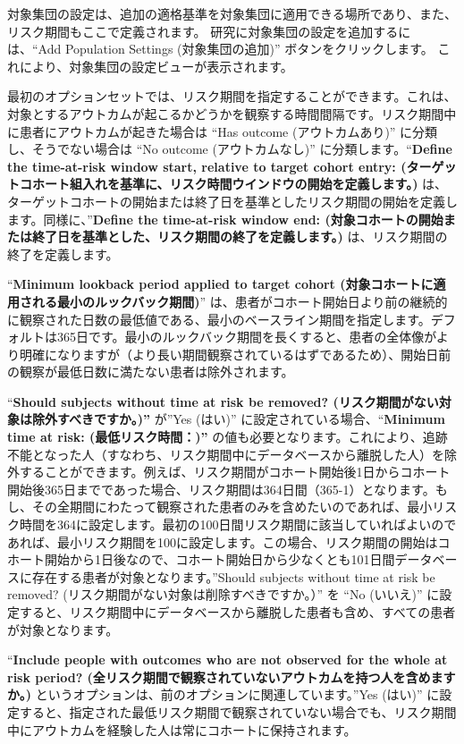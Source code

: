 \documentclass[
  11pt]{book}
\theoremstyle{definition}
\theoremstyle{definition}
\theoremstyle{definition}
\theoremstyle{definition}
\theoremstyle{remark}
\begin{document}
対象集団の設定は、追加の適格基準を対象集団に適用できる場所であり、また、リスク期間もここで定義されます。 研究に対象集団の設定を追加するには、``Add Population Settings (対象集団の追加)'' ボタンをクリックします。 これにより、対象集団の設定ビューが表示されます。

最初のオプションセットでは、リスク期間を指定することができます。これは、対象とするアウトカムが起こるかどうかを観察する時間間隔です。リスク期間中に患者にアウトカムが起きた場合は ``Has outcome (アウトカムあり)'' に分類し、そうでない場合は ``No outcome (アウトカムなし)'' に分類します。``\textbf{Define the time-at-risk window start, relative to target cohort entry: (ターゲットコホート組入れを基準に、リスク時間ウインドウの開始を定義します。)} は、ターゲットコホートの開始または終了日を基準としたリスク期間の開始を定義します。同様に、''\textbf{Define the time-at-risk window end: (対象コホートの開始または終了日を基準とした、リスク期間の終了を定義します。)} は、リスク期間の終了を定義します。

``\textbf{Minimum lookback period applied to target cohort (対象コホートに適用される最小のルックバック期間)}'' は、患者がコホート開始日より前の継続的に観察された日数の最低値である、最小のベースライン期間を指定します。デフォルトは365日です。最小のルックバック期間を長くすると、患者の全体像がより明確になりますが（より長い期間観察されているはずであるため）、開始日前の観察が最低日数に満たない患者は除外されます。

``\textbf{Should subjects without time at risk be removed? (リスク期間がない対象は除外すべきですか。)''} が''Yes (はい)'' に設定されている場合、``\textbf{Minimum time at risk: (最低リスク時間：)''} の値も必要となります。これにより、追跡不能となった人（すなわち、リスク期間中にデータベースから離脱した人）を除外することができます。例えば、リスク期間がコホート開始後1日からコホート開始後365日までであった場合、リスク期間は364日間（365-1）となります。もし、その全期間にわたって観察された患者のみを含めたいのであれば、最小リスク時間を364に設定します。最初の100日間リスク期間に該当していればよいのであれば、最小リスク期間を100に設定します。この場合、リスク期間の開始はコホート開始から1日後なので、コホート開始日から少なくとも101日間データベースに存在する患者が対象となります。''Should subjects without time at risk be removed? (リスク期間がない対象は削除すべきですか。）'' を ``No (いいえ)'' に設定すると、リスク期間中にデータベースから離脱した患者も含め、すべての患者が対象となります。

``\textbf{Include people with outcomes who are not observed for the whole at risk period? (全リスク期間で観察されていないアウトカムを持つ人を含めますか。)} というオプションは、前のオプションに関連しています。''Yes (はい)'' に設定すると、指定された最低リスク期間で観察されていない場合でも、リスク期間中にアウトカムを経験した人は常にコホートに保持されます。
\end{document}
